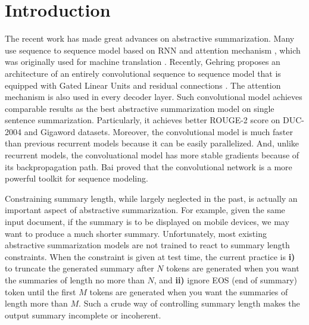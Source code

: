 \section{Introduction}
\label{sec:intro}


The recent work \cite{RushCW15,ChopraAR16,NallapatiZSGX16,SeeLM17,PaulusXS17}
has made great advances on abstractive summarization.
Many use sequence to sequence model based on RNN
and attention mechanism \cite{RushCW15}, which was originally used
for machine translation \cite{SutskeverVL14,BahdanauCB14}.
Recently, Gehring  proposes an architecture
of an entirely convolutional sequence to sequence model that is equipped with
Gated Linear Units \cite{DauphinFAG17} and residual connections \cite{HeZRS16}.
The attention mechanism is also used in every decoder layer.
Such convolutional model achieves comparable results as the
best abstractive summarization model on single sentence summarization.
Particularly, it achieves better ROUGE-2 score on DUC-2004 and Gigaword
datasets. Moreover, the convolutional model is much faster
than previous recurrent models because it can be easily parallelized.
And, unlike recurrent models, the convoluational model has more stable
gradients because of its backpropagation path. 
Bai  proved that the convolutional
network is a more powerful toolkit for sequence modeling.


Constraining summary length, while largely neglected in the past,
is actually an important aspect of abstractive summarization.
For example, given the same input document,
if the summary is to be displayed on mobile devices,
we may want to produce a much shorter summary.
Unfortunately, most existing abstractive summarization models are not
trained to react to summary length constraints.
When the constraint is given at test time, the current
practice is \textbf{i)} to truncate the generated summary after $N$ tokens are generated when you want 
the summaries of length no more than $N$,
and \textbf{ii)} ignore EOS (end of summary) token until the first $M$ tokens are generated when you want
the summaries of length more than $M$.
Such a crude way of controlling
summary length makes the output summary incomplete or incoherent.

